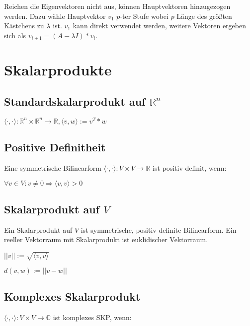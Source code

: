 Reichen die Eigenvektoren nicht aus, können Hauptvektoren hinzugezogen werden. Dazu wähle Hauptvektor $v_1$ $p$-ter Stufe wobei $p$ Länge des größten Kästchens zu $\lambda$ ist. $v_1$ kann direkt verwendet werden, weitere Vektoren ergeben sich als $v_{i+1} = (A-\lambda I)*v_i$.

\section*{Skalarprodukte}

\subsection*{Standardskalarprodukt auf $\mathbb{R}^n$}

$\langle \cdot, \cdot \rangle : \mathbb{R}^n \times \mathbb{R}^n \rightarrow \mathbb{R}, \langle v, w \rangle := v^T * w$

\subsection*{Positive Definitheit}

Eine symmetrische Bilinearform $\langle \cdot, \cdot \rangle : V \times V \rightarrow \mathbb{R}$ ist positiv definit, wenn:

$\forall v \in V: v \neq 0 \Rightarrow \langle v, v \rangle > 0$

\subsection*{Skalarprodukt auf $V$}

Ein Skalarprodukt auf $V$ ist symmetrische, positiv definite Bilinearform. Ein reeller Vektorraum mit Skalarprodukt ist euklidischer Vektorraum.

\begin{description}[leftmargin=!,labelwidth=10mm]
	\item[Norm]   $||v|| := \sqrt{\langle v, v \rangle}$
	\item[Metrik] $d(v, w) := ||v - w||$
\end{description}

\subsection*{Komplexes Skalarprodukt}

$\langle \cdot, \cdot \rangle : V \times V \rightarrow \mathbb{C}$ ist komplexes SKP, wenn:

